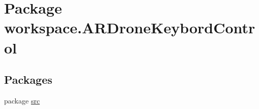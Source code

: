\hypertarget{namespaceworkspace_1_1_a_r_drone_keybord_control}{}\section{Package workspace.\+A\+R\+Drone\+Keybord\+Control}
\label{namespaceworkspace_1_1_a_r_drone_keybord_control}
\subsection*{Packages}
\begin{DoxyCompactItemize}
\item 
package \hyperlink{namespaceworkspace_1_1_a_r_drone_keybord_control_1_1src}{src}
\end{DoxyCompactItemize}
